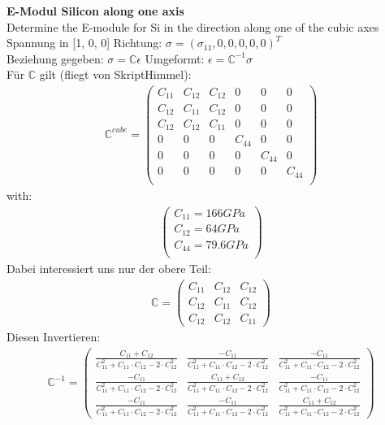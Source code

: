 \documentclass[a4paper]{scrartcl}
\begin{document}
\textbf{E-Modul Silicon along one axis}\\
Determine the E-module for Si in the direction along one of the cubic
axes\\

Spannung in [1, 0, 0] Richtung: $\sigma = (\sigma_{11}, 0, 0, 0, 0, 0)^T$\\

Beziehung gegeben: $\sigma = \mathbb{C} \epsilon$ Umgeformt: $\epsilon =
\mathbb{C}^{-1} \sigma$\\

Für $\mathbb{C}$ gilt (fliegt von SkriptHimmel):
\begin{align}
\mathbb{C}^{cube} = \begin{pmatrix}
C_{11} & C_{12} & C_{12} & 0 & 0 & 0\\
C_{12} & C_{11} & C_{12} & 0 & 0 & 0\\
C_{12} & C_{12} & C_{11} & 0 & 0 & 0\\
0 & 0 & 0 & C_{44} & 0 & 0\\
0 & 0 & 0 & 0 & C_{44} & 0\\
0 & 0 & 0 & 0 & 0 & C_{44}\\
\end{pmatrix}
\end{align}
with:
\begin{align}
\begin{pmatrix}
C_{11} = 166 GPa\\
C_{12} = 64 GPa\\
C_{44} = 79.6 GPa\\
\end{pmatrix}
\end{align}
Dabei interessiert uns nur der obere Teil:
\begin{align}
\mathbb{C} = \begin{pmatrix}
C_{11} & C_{12} & C_{12}\\
C_{12} & C_{11} & C_{12}\\
C_{12} & C_{12} & C_{11}
\end{pmatrix}
\end{align}
Diesen Invertieren:
\begin{align}
\mathbb{C}^{-1} = \begin{pmatrix}
\frac{C_{11} + C_{12}}{C_{11}^2 + C_{11} \cdot C_{12} - 2 \cdot C_{12}^2} &
\frac{-C_{11}}{C_{11}^2 + C_{11} \cdot C_{12} - 2 \cdot C_{12}^2} &
\frac{-C_{11}}{C_{11}^2 + C_{11} \cdot C_{12} - 2 \cdot C_{12}^2}\\
\frac{-C_{11}}{C_{11}^2 + C_{11} \cdot C_{12} - 2 \cdot C_{12}^2} &
\frac{C_{11} + C_{12}}{C_{11}^2 + C_{11} \cdot C_{12} - 2 \cdot C_{12}^2} & 
\frac{-C_{11}}{C_{11}^2 + C_{11} \cdot C_{12} - 2 \cdot C_{12}^2}\\
\frac{-C_{11}}{C_{11}^2 + C_{11} \cdot C_{12} - 2 \cdot C_{12}^2} &
\frac{-C_{11}}{C_{11}^2 + C_{11} \cdot C_{12} - 2 \cdot C_{12}^2} &
\frac{C_{11} + C_{12}}{C_{11}^2 + C_{11} \cdot C_{12} - 2 \cdot C_{12}^2}
\end{pmatrix}
\end{align}
\end{document}
